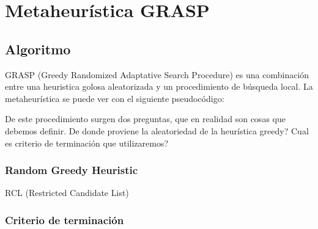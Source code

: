 \section{Metaheurística GRASP}

\subsection{Algoritmo}

GRASP (Greedy Randomized Adaptative Search Procedure) es una combinación entre una heuristica golosa aleatorizada y un procedimiento de búsqueda local. La metaheurística se puede ver con el siguiente pseudocódigo:

\begin{algorithmic}
\EndWhile
\EndProcedure
\end{algorithmic}

De este procedimiento surgen dos preguntas, que en realidad son cosas que debemos definir. De donde proviene la aleatoriedad de la heurística greedy? Cual es criterio de terminación que utilizaremos?

\subsubsection{Random Greedy Heuristic}

RCL (Restricted Candidate List)

\subsubsection{Criterio de terminación}